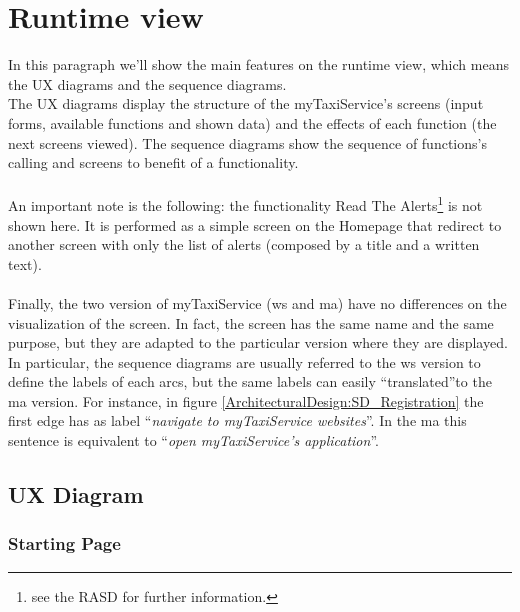 \documentclass[\mainpath/main]{subfiles}
\begin{document}
\section{Runtime view}
\label{ArchitecturalDesign:runtime}

In this paragraph we'll show the main features on the runtime view, which means the UX diagrams and the sequence diagrams.\\
The UX diagrams display the structure of the myTaxiService's screens (input forms, available functions and shown data) and the effects of each function (the next screens viewed). The sequence diagrams show the sequence of functions's calling and screens to benefit of a functionality.\\
\\
An important note is the following: the functionality Read The Alerts\footnote{see the RASD for further information.} is not shown here. It is performed as a simple screen on the Homepage that redirect to another screen with only the list of alerts (composed by a title and a written text).\\
\\
Finally, the two version of myTaxiService (\gls{ws} and \gls{ma}) have no differences on the visualization of the screen. In fact, the screen has the same name and the same purpose, but they are adapted to the particular version where they are displayed.\\
In particular, the sequence diagrams are usually referred to the \gls{ws} version to define the labels of each arcs, but the same labels can easily \textquotedblleft translated\textquotedblright to the \gls{ma} version. For instance, in figure \ref{ArchitecturalDesign:SD_Registration} the first edge has as label \textquotedblleft \textit{navigate to myTaxiService websites}\textquotedblright . In the \gls{ma} this sentence is equivalent to \textquotedblleft \textit{open myTaxiService's application}\textquotedblright .

\clearpage

\subsection{UX Diagram}
\label{ArchitecturalDesign:UX}

\subsubsection{Starting Page}
\label{ArchitecturalDesign:UX_StartingPage}
\end{document}
